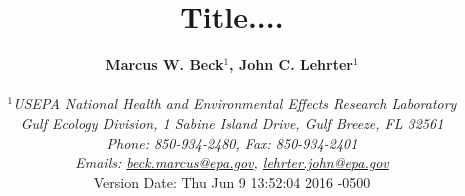\documentclass[letterpaper,12pt,oneside]{article}\usepackage[]{graphicx}\usepackage[]{color}
\begin{document}
\raggedbottom
\linenumbers
\raggedright
{}
\setlength{\parindent}{0.5in}
\renewcommand\refname{References \vspace{12pt}}

\begin{singlespace}
\title{{\bf {\Large Title....}}}
\author{
  {\bf {\normalsize Marcus W. Beck$^1$, John C. Lehrter$^1$}}
  \\\\{\textit {\normalsize $^1$USEPA National Health and Environmental Effects Research Laboratory}}
  \\{\textit {\normalsize Gulf Ecology Division, 1 Sabine Island Drive, Gulf Breeze, FL 32561}}
	\\{\textit {\normalsize Phone: 850-934-2480, Fax: 850-934-2401}}
	\\{\textit {\normalsize Emails: \href{mailto:beck.marcus@epa.gov}{beck.marcus@epa.gov}, \href{mailto:lehrter.john@epa.gov}{lehrter.john@epa.gov}}}
  \vspace{1in} 
  \\ Version Date:   Thu Jun 9 13:52:04 2016 -0500
	}
\date{}
\maketitle
\end{singlespace}
\clearpage
\end{document}
